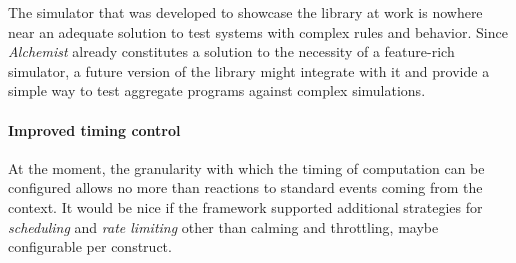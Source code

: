 The simulator that was developed to showcase the library at work is nowhere near an adequate solution to test systems with complex rules and behavior.
%
Since \textit{Alchemist} \cite{pianini2013chemical} already constitutes a solution to the necessity of a feature-rich simulator, a future version of the library might integrate with it and provide a simple way to test aggregate programs against complex simulations.

\paragraph{Improved timing control}

At the moment, the granularity with which the timing of computation can be configured allows no more than reactions to standard events coming from the context.
%
It would be nice if the framework supported additional strategies for \textit{scheduling} and \textit{rate limiting} other than calming and throttling, maybe configurable per construct.
